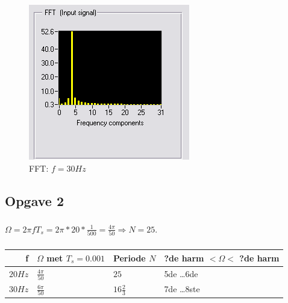 \documentclass[a4paper, 12pt, titlepage]{article}
\begin{document}
\begin{figure}[H]
\includegraphics[scale=0.7]{FFT30hz.png}
\caption{FFT: $f=30Hz$}
\end{figure}
\subsection{Opgave 2}
\subsubsection{}
$ \Omega = 2 \pi f T_s = 2 \pi * 20 * \frac{1}{500} = \frac{4\pi}{50}
\Rightarrow N = 25$.
\subsubsection{}
\begin{tabular}{r || l | l | l}
    f & $\Omega$ met $T_s = 0.001$  & Periode $N$ & ?de harm $< \Omega<$ ?de
    harm \\ \hline \hline
    $20 Hz$ & $\frac{4\pi}{50}$ & $25$ & 5de \dots 6de \\ \hline
    $30 Hz$ & $\frac{6\pi}{50}$ & $16\frac{2}{3}$ & 7de \dots 8ste \\ 
\end{tabular}
\end{document}
